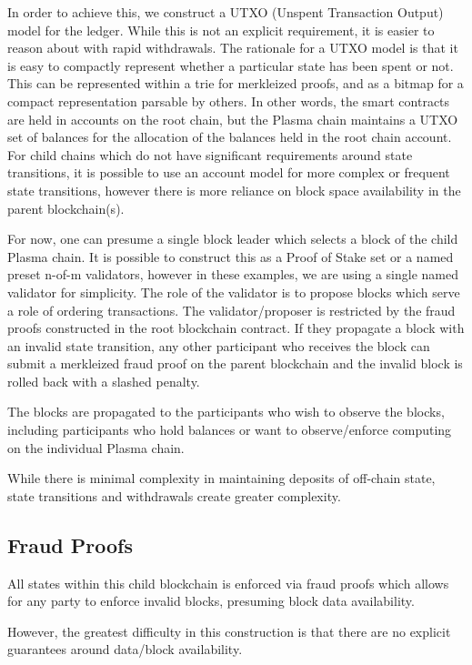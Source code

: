 \documentclass[letterpaper, 11pt]{article}
\begin{document}
In order to achieve this, we construct a UTXO (Unspent Transaction Output) model
for the ledger. While this is not an explicit requirement, it is easier to
reason about with rapid withdrawals. The rationale for a UTXO model is that it
is easy to compactly represent whether a particular state has been spent or not.
This can be represented within a trie for merkleized proofs, and as a bitmap for
a compact representation parsable by others. In other words, the smart contracts
are held in accounts on the root chain, but the Plasma chain maintains a UTXO
set of balances for the allocation of the balances held in the root chain
account. For child chains which do not have significant requirements around
state transitions, it is possible to use an account model for more complex or
frequent state transitions, however there is more reliance on block space
availability in the parent blockchain(s).

For now, one can presume a single block leader which selects a block of the
child Plasma chain. It is possible to construct this as a Proof of Stake set or
a named preset n-of-m validators, however in these examples, we are using a
single named validator for simplicity. The role of the validator is to propose
blocks which serve a role of ordering transactions. The validator/proposer is
restricted by the fraud proofs constructed in the root blockchain contract. If
they propagate a block with an invalid state transition, any other participant
who receives the block can submit a merkleized fraud proof on the parent
blockchain and the invalid block is rolled back with a slashed penalty.

The blocks are propagated to the participants who wish to observe the blocks,
including participants who hold balances or want to observe/enforce computing on
the individual Plasma chain.

While there is minimal complexity in maintaining deposits of off-chain state,
state transitions and withdrawals create greater complexity.

\subsection{Fraud Proofs}

All states within this child blockchain is enforced via fraud proofs which
allows for any party to enforce invalid blocks, presuming block data
availability.

However, the greatest difficulty in this construction is that there are no
explicit guarantees around data/block availability. 
\end{document}
